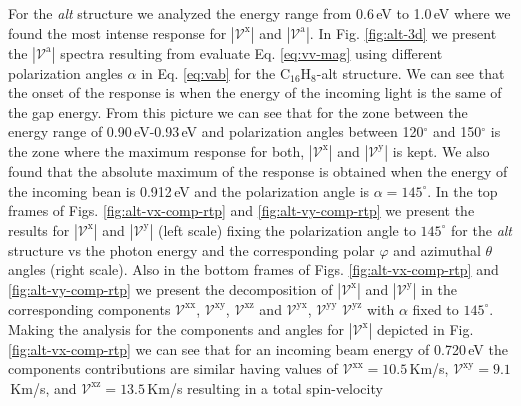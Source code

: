 \documentclass[prb,11pt,tightenlines,twocolumn,aps]{revtex4-1}
\begin{document}
For the \emph{alt} structure we analyzed the energy range from 0.6\,eV to
1.0\,eV where we found the most intense response for 
$|\mathcal{V}^{\mathrm{x}}|$ and $|\mathcal{V}^{\mathrm{a}}|$. In Fig. 
\ref{fig:alt-3d} we present the $|\mathcal{V}^{\mathrm{a}}|$ spectra resulting 
from evaluate Eq. \eqref{eq:vv-mag} using different polarization angles $\alpha$
in Eq. \eqref{eq:vab} for the C$_{16}$H$_{8}$-alt structure. We can see that the
onset of the response is when the energy of the incoming light is the same of
the gap energy.
%
From this picture we can see that for the zone between the energy range of
0.90\,eV-0.93\,eV and polarization angles between 120$^{\circ}$ and
150$^{\circ}$ is the zone where the maximum response for both,
$|\mathcal{V}^{\mathrm{x}}|$ and $|\mathcal{V}^{\mathrm{y}}|$ is kept.
We also found that the absolute maximum of the response is obtained when the
energy of the incoming bean is 0.912\,eV and the polarization angle is $\alpha =
145^{\circ}$. 
% 
In the top frames of Figs. \ref{fig:alt-vx-comp-rtp}  and 
%
\ref{fig:alt-vy-comp-rtp} we present the results for
$|\mathcal{V}^{\mathrm{x}}|$ and $|\mathcal{V}^{\mathrm{y}}|$ (left scale)
fixing the polarization angle to $145^{\circ}$ for the \emph{alt} structure vs
the photon energy and the corresponding polar $\varphi$ and azimuthal $\theta$
angles (right scale). Also in the bottom frames of Figs. 
% 
\ref{fig:alt-vx-comp-rtp} and \ref{fig:alt-vy-comp-rtp} we present the
decomposition of $|\mathcal{V}^{\mathrm{x}}|$ and $|\mathcal{V}^{\mathrm{y}}|$
in the corresponding components $\mathcal{V}^{\mathrm{xx}}$,
$\mathcal{V}^{\mathrm{xy}}$, $\mathcal{V}^{\mathrm{xz}}$ and
$\mathcal{V}^{\mathrm{yx}}$, $\mathcal{V}^{\mathrm{yy}}$
$\mathcal{V}^{\mathrm{yz}}$ with $\alpha$ fixed to $145^{\circ}$.
Making the analysis for the components and angles for
$|\mathcal{V}^{\mathrm{x}}|$ depicted in Fig. \ref{fig:alt-vx-comp-rtp} we can
see that for an incoming beam energy of 0.720\,eV the components contributions 
are similar having values of
%
$\mathcal{V}^{\mathrm{xx}}= 10.5$\,Km/s, 
$\mathcal{V}^{\mathrm{xy}}=  9.1$\,Km/s, and
$\mathcal{V}^{\mathrm{xz}}= 13.5$\,Km/s
% 
resulting in a total spin-velocity 
\end{document}
